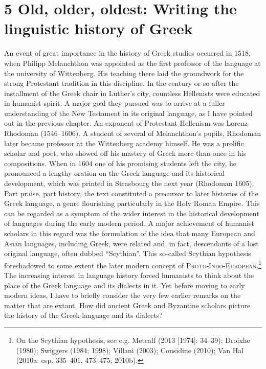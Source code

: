 \clearpage\section[5 Old, older, oldest: Writing the linguistic history of Greek]{\textsc{5 }Old, older, oldest: Writing the linguistic history of Greek}
\hypertarget{Toc19704834}{}\begin{styleStandard}
An event of great importance in the history of Greek studies occurred in 1518, when Philipp Melanchthon was appointed as the first professor of the language at the university of Wittenberg. His teaching there laid the groundwork for the strong Protestant tradition in this discipline. In the century or so after the installment of the Greek chair in Luther’s city, countless Hellenists were educated in humanist spirit. A major goal they pursued was to arrive at a fuller understanding of the New Testament in its original language, as I have pointed out in the previous chapter. An exponent of Protestant Hellenism was Lorenz Rhodoman (1546–1606). A student of several of Melanchthon’s pupils, Rhodoman later became professor at the Wittenberg academy himself. He was a prolific scholar and poet, who showed off his mastery of Greek more than once in his compositions. When in 1604 one of his promising students left the city, he pronounced a lengthy oration on the Greek language and its historical development, which was printed in Strasbourg the next year (Rhodoman 1605). Part praise, part history, the text constituted a precursor to later histories of the Greek language, a genre flourishing particularly in the Holy Roman Empire. This can be regarded as a symptom of the wider interest in the historical development of languages during the early modern period. A major achievement of humanist scholars in this regard was the formulation of the idea that many European and Asian languages, including Greek, were related and, in fact, descendants of a lost original language, often dubbed “Scythian”. This so-called Scythian hypothesis foreshadowed to some extent the later modern concept of \textsc{Proto-Indo-European}.\footnote{ On the Scythian hypothesis, see e.g. Metcalf (2013 [1974]: 34–39); Droixhe (1980); Swiggers (1984; 1998); Villani (2003); Considine (2010); Van Hal (2010a: esp. 335–401, 473–475; 2010b).} The increasing interest in language history forced humanists to think about the place of the Greek language and its dialects in it. Yet before moving to early modern ideas, I have to briefly consider the very few earlier remarks on the matter that are extant. How did ancient Greek and Byzantine scholars picture the history of the Greek language and its dialects?
\end{styleStandard}


